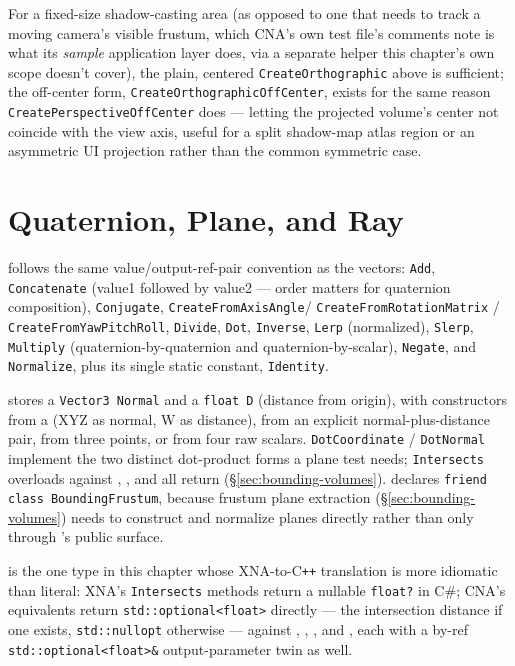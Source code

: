 For a fixed-size shadow-casting area (as opposed to one that needs to track a moving camera's
visible frustum, which CNA's own test file's comments note is what its \emph{sample}
application layer does, via a separate helper this chapter's own scope doesn't cover), the
plain, centered \texttt{CreateOrthographic} above is sufficient; the off-center form,
\texttt{CreateOrthographicOffCenter}, exists for the same reason
\texttt{CreatePerspectiveOffCenter} does --- letting the projected volume's center not
coincide with the view axis, useful for a split shadow-map atlas region or an asymmetric UI
projection rather than the common symmetric case.

\section{Quaternion, Plane, and Ray}

 follows the same value/output-ref-pair convention as the vectors:
\texttt{Add}, \texttt{Concatenate} (value1 followed by value2 --- order matters for
quaternion composition), \texttt{Conjugate}, \texttt{CreateFromAxisAngle}/%
\texttt{CreateFromRotationMatrix} / \texttt{CreateFromYawPitchRoll}, \texttt{Divide},
\texttt{Dot}, \texttt{Inverse}, \texttt{Lerp} (normalized), \texttt{Slerp},
\texttt{Multiply} (quaternion-by-quaternion and quaternion-by-scalar), \texttt{Negate}, and
\texttt{Normalize}, plus its single static constant, \texttt{Identity}.

 stores a \texttt{Vector3 Normal} and a \texttt{float D} (distance from
origin), with constructors from a  (XYZ as normal, W as distance), from an
explicit normal-plus-distance pair, from three points, or from four raw scalars.
\texttt{DotCoordinate} / \texttt{DotNormal} implement the two distinct dot-product forms a
plane test needs; \texttt{Intersects} overloads against ,
, and  all return
 (\S\ref{sec:bounding-volumes}).  declares
\texttt{friend class BoundingFrustum}, because frustum plane extraction
(\S\ref{sec:bounding-volumes}) needs to construct and normalize planes directly rather than
only through 's public surface.

 is the one type in this chapter whose XNA-to-C\texttt{++} translation is more
idiomatic than literal: XNA's \texttt{Intersects} methods return a nullable
\texttt{float?} in C\#; CNA's equivalents return \texttt{std::optional<float>} directly ---
the intersection distance if one exists, \texttt{std::nullopt} otherwise --- against
, , , and
, each with a by-ref \texttt{std::optional<float>\&} output-parameter
twin as well.

